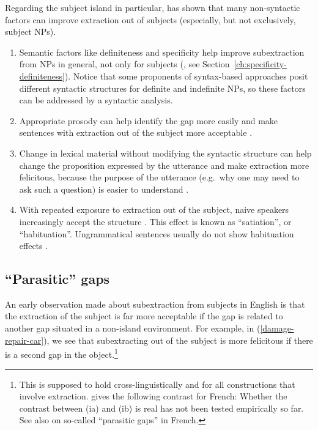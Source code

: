 Regarding the subject island in particular, \citeauthor{Chaves.2013} has shown that many non-syn\-tac\-tic factors can improve extraction out of subjects (especially, but not exclusively, subject NPs). 

\begin{enumerate}
    \item Semantic factors like definiteness and specificity help improve subextraction from NPs in general, not only for subjects (\citealt{Jimenez-Fernandez.2009,Chaves.2013,Simonenko.2015}, see Section~\ref{ch:specificity-definiteness}). Notice that some proponents of syntax-based approaches posit different syntactic structures for definite and indefinite NPs, so these factors can be addressed by a syntactic analysis. 
    \item Appropriate prosody can help identify the gap more easily and make sentences with extraction out of the subject more acceptable \citep{Chaves.2014}.
    \item\sloppy Change in lexical material without modifying the syntactic structure can help change the proposition expressed by the utterance and make extraction more felicitous, because the purpose of the utterance (e.g.\ why one may need to ask such a question) is easier to understand \citep{Chaves.2019.Frequency}.
    \item With repeated exposure to extraction out of the subject, naive speakers increasingly accept the structure \citep{Chaves.2014,Do.2017}. This effect is known as ``satiation'', or ``habituation''. Ungrammatical sentences usually do not show habituation effects \citep{Sprouse.2007.Acceptability}. 
\end{enumerate}

\subsection{``Parasitic'' gaps}
\label{ch:parasitic-gaps}


An early observation made about subextraction from subjects in English is that the extraction of the subject is far more acceptable if the gap is related to another gap situated in a non-island environment. For example, in (\ref{damage-repair-car}), we see that subextracting out of the subject is more felicitous if there is a second gap in the object.\footnote{This is supposed to hold cross-linguistically and for all constructions that involve extraction. \citeauthor{Tellier.1991} gives the following contrast for French:
\ea \citep[122]{Tellier.1991}
\z
\z
Whether the contrast between (ia) and (ib) is real has not been tested empirically so far. See also \citet[117--119]{Godard.1988} on so-called ``parasitic gaps'' in French.}

